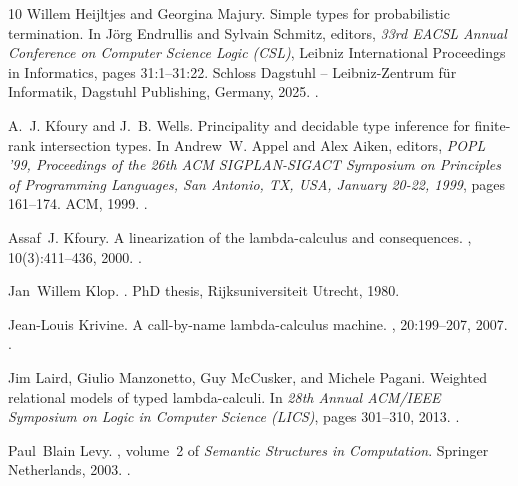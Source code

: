 \documentclass[10pt,a4paper]{amsart}
\begin{document}
\begin{thebibliography}{10}
Willem Heijltjes and Georgina Majury.
\newblock Simple types for probabilistic termination.
\newblock In J{\"o}rg Endrullis and Sylvain Schmitz, editors, {\em 33rd EACSL
  Annual Conference on Computer Science Logic (CSL)}, Leibniz International
  Proceedings in Informatics, pages 31:1--31:22. Schloss Dagstuhl --
  Leibniz-Zentrum f{\"u}r Informatik, Dagstuhl Publishing, Germany, 2025.
\newblock \href {https://doi.org/10.4230/LIPIcs.CSL.2025.31}
  {}.

A.~J. Kfoury and J.~B. Wells.
\newblock Principality and decidable type inference for finite-rank
  intersection types.
\newblock In Andrew~W. Appel and Alex Aiken, editors, {\em {POPL} '99,
  Proceedings of the 26th {ACM} {SIGPLAN-SIGACT} Symposium on Principles of
  Programming Languages, San Antonio, TX, USA, January 20-22, 1999}, pages
  161--174. {ACM}, 1999.
\newblock \href {https://doi.org/10.1145/292540.292556}
  {}.

Assaf~J. Kfoury.
\newblock A linearization of the lambda-calculus and consequences.
, 10(3):411--436, 2000.
\newblock \href {https://doi.org/10.1093/LOGCOM/10.3.411}
  {}.

Jan~Willem Klop.
.
\newblock PhD thesis, Rijksuniversiteit Utrecht, 1980.

Jean-Louis Krivine.
\newblock A call-by-name lambda-calculus machine.
, 20:199--207, 2007.
\newblock \href {https://doi.org/10.1007/s10990-007-9018-9}
  {}.

Jim Laird, Giulio Manzonetto, Guy McCusker, and Michele Pagani.
\newblock Weighted relational models of typed lambda-calculi.
\newblock In {\em 28th Annual {ACM/IEEE} Symposium on Logic in Computer Science
  (LICS)}, pages 301--310, 2013.
\newblock \href {https://doi.org/10.1109/LICS.2013.36}
  {}.

Paul~Blain Levy.
,
  volume~2 of {\em Semantic Structures in Computation}.
\newblock Springer Netherlands, 2003.
\newblock \href {https://doi.org/10.1007/978-94-007-0954-6}
  {}.


\end{thebibliography}
\end{document}

